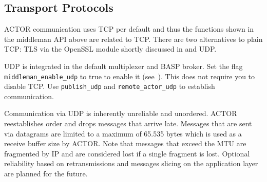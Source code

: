 \subsection{Transport Protocols \experimental}
\label{transport-protocols}

ACTOR communication uses TCP per default and thus the functions shown in the
middleman API above are related to TCP. There are two alternatives to plain
TCP: TLS via the OpenSSL module shortly discussed in
 and UDP.

UDP is integrated in the default multiplexer and BASP broker. Set the flag
\lstinline^middleman_enable_udp^ to true to enable it
(see~). This does not require you to disable TCP. Use
\lstinline^publish_udp^ and \lstinline^remote_actor_udp^ to establish
communication.

Communication via UDP is inherently unreliable and unordered. ACTOR reestablishes
order and drops messages that arrive late. Messages that are sent via datagrams
are limited to a maximum of 65.535 bytes which is used as a receive buffer size
by ACTOR. Note that messages that exceed the MTU are fragmented by IP and are
considered lost if a single fragment is lost. Optional reliability based on
retransmissions and messages slicing on the application layer are planned for
the future.
